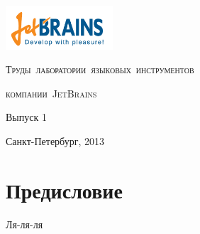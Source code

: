 \documentclass{llncs}
\begin{document}
\sloppy

\begin{titlepage}

\centering

\includegraphics[width=4cm]{JBLogoWhite.png}

\vskip 4cm

\mbox{\LARGE{\textsc{Труды лаборатории языковых инструментов}}}
\vskip 0.5cm

\mbox{\LARGE{\textsc{компании JetBrains}}}
\vskip 3cm

\Large{Выпуск 1}
\vskip 7cm

\Large{Санкт-Петербург, 2013}
\end{titlepage}

\chapter*{Предисловие}

Ля-ля-ля

\tableofcontents














\end{document}
